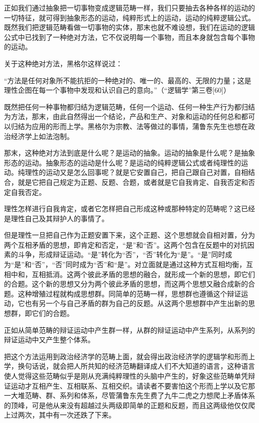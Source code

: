 \documentclass[a4paper,twoside,12pt,AutoFakeBold]{ctexart}
\begin{document}
正如我们通过抽象把一切事物变成逻辑范畴一样，我们只要抽去各种各样的运动的一切特征，就可得到抽象形态的运动，纯粹形式上的运动，运动的纯粹逻辑公式。既然我们把逻辑范畴看做一切事物的实体，那末也就不难设想，我们在运动的逻辑公式中已找到了一种绝对方法，它不仅说明每一个事物，而且本身就包含每个事物的运动。

关于这种绝对方法，黑格尔这样说过：

\begin{fangsong}
    “方法是任何对象所不能抗拒的一种绝对的、唯一的、最高的、无限的力量；这是理性企图在每一个事物中发现和认识自己的意向。”（“逻辑学”第三卷[60]）
\end{fangsong}

既然把任何一种事物都归结为逻辑范畴，任何一个运动、任何一种生产行为都归结为方法，那末，由此自然得出一个结论，产品和生产、对象和运动的任何总和都可以归结为应用的形而上学。黑格尔为宗教、法等做过的事情，蒲鲁东先生也想在政治经济学上如法泡制。

那末，这种绝对方法到底是什么呢？是运动的抽象。运动的抽象是什么呢？是抽象形态的运动。抽象形态的运动是什么呢？是运动的纯粹逻辑公式或者纯理性的运动。纯理性的运动又是怎么回事呢？就是它安置自己，把自己跟自己对置，自相结合，就是它把自己规定为正题、反题、合题，或者就是它自我肯定、自我否定和否定自我否定。

理性怎样进行自我肯定，或者它怎样把自己形成这种或那种特定的范畴呢？这已经是理性自己及其辩护人的事情了。

但是理性一旦把自己作为正题安置下来，这个正题、这个思想就会自相对置，分为两个互相矛盾的思想，即肯定和否定，“是”和“否”。这两个包含在反题中的对抗因素的斗争，形成辩证运动。“是”转化为“否”，“否”转化为“是”。“是”同时成为“是”和“否”，“否”同时成为“否”和“是”。对立面就是通过这种方式互相均衡，互相中和，互相抵消。这两个彼此矛盾的思想的融合，就形成一个新的思想，即它们的合题。这个新的思想又分为两个彼此矛盾的思想，而这两个思想又融合成新的合题。这种增殖过程就构成思想群。同简单的范畴一样，思想群也遵循这个辩证运动，它也有另一个与自己矛盾的群为自己的反题。从这两个思想群中产生出新的思想群，即它们的合题。

正如从简单范畴的辩证运动中产生群一样，从群的辩证运动中产生系列，从系列的辩证运动中又产生整个体系。

把这个方法运用到政治经济学的范畴上面，就会得出政治经济学的逻辑学和形而上学，换句话说，就会把人所共知的经济范畴翻译成人们不大知道的语言，这种语言使人觉得这些范畴似乎是刚从充满纯粹理性的头脑中产生的，好象这些范畴单凭辩证运动才互相产生、互相联系、互相交织。请读者不要害怕这个形而上学以及它那一大堆范畴、群、系列和体系，尽管蒲鲁东先生费了九牛二虎之力想爬上矛盾体系的顶峰，可是他从来没有超越过头两级即简单的正题和反题，而且这两级他仅仅爬上过两次，其中有一次还跌了下来。
\end{document}
